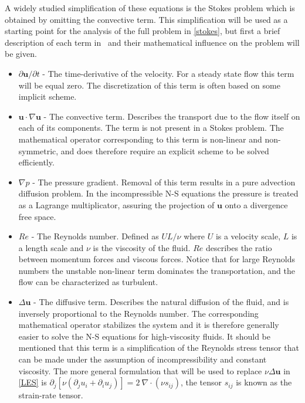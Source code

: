 A widely studied simplification of these equations is the Stokes problem which
is obtained by omitting the convective term. This simplification will be used as a starting point for
the analysis of the full problem in \cref{stokes}, but first a brief description of each 
term in~ and their mathematical influence on the problem will be given. 
\begin{itemize}
    \item $\partial \mathbf{u} /\partial t$
     - The time-derivative of the velocity. For a steady state flow this term will be equal zero.
             The discretization of this term is often based on some implicit scheme. 
    \item $\mathbf{u} \cdot \nabla \mathbf{u}$
     - The convective term. Describes the transport due to the flow itself on each of its components. 
    The term is not present in a Stokes problem.
    The mathematical operator corresponding to this term is non-linear and non-symmetric, 
    and does therefore require an explicit scheme to be solved efficiently.

    \item $\nabla p$
    - The pressure gradient. Removal of this term results in a pure advection diffusion problem. In the incompressible 
    N-S equations the pressure is treated as a Lagrange multiplicator, assuring the projection of $\mathbf{u}$ onto a divergence free space.

    \item $Re$ 
    - The Reynolds number. Defined as $UL/\nu$ where $U$ is a velocity scale, $L$ is a length scale and $\nu$ 
      is the viscosity of the fluid. $Re$ describes the ratio between momentum forces and viscous forces.
      Notice that for large Reynolds numbers the unstable non-linear term dominates the transportation, and
      the flow can be characterized as turbulent.

    \item $\Delta \mathbf{u}$ 
    - The diffusive term. Describes the natural diffusion of the fluid,
    and is inversely proportional to the Reynolds number.
    The corresponding mathematical operator stabilizes the system and it is therefore generally easier
    to solve the N-S equations for high-viscosity fluids. It should be mentioned that this term is a simplification 
    of the Reynolds stress tensor that can be made under the assumption of incompressibility and constant viscosity.
    The more general formulation that will be used to replace $\nu\Delta\mathbf{u}$ in \cref{LES} is
    $\partial_j \left[  \nu(\partial_j u_i + \partial_i u_j)\right] = 2\: \nabla \cdot(\nu s_{ij})$,
    the tensor $s_{ij}$ is known as the strain-rate tensor. 


\end{itemize}
